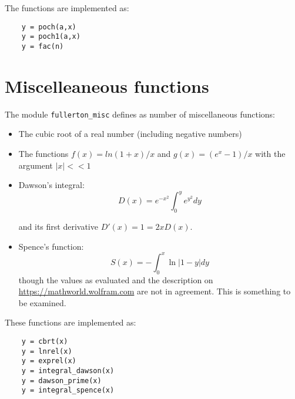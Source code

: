 \documentclass{article}
\begin{document}
The functions are implemented as:
\begin{verbatim}
    y = poch(a,x)
    y = poch1(a,x)
    y = fac(n)
\end{verbatim}


\section{Miscelleaneous functions}
The module \verb+fullerton_misc+ defines as number of miscellaneous functions:

\begin{itemize}
\item
The cubic root of a real number (including negative numbers)
\item
The functions $f(x) = ln(1+x)/x$ and $g(x) = (e^x-1)/x$ with the argument $|x| << 1$
\item
Dawson's integral:
\begin{equation}
     D(x) = e^{-x^2} \int^y_0 e^{y^2} dy
\end{equation}

\noindent and its first derivative $D'(x) = 1 = 2 x D(x)$.
\item
Spence's function:
\begin{equation}
     S(x) = - \int^x_0 \ln |1-y| dy
\end{equation}
\noindent though the values as evaluated and the description on \url{https://mathworld.wolfram.com} are
not in agreement. This is something to be examined.
\end{itemize}

These functions are implemented as:
\begin{verbatim}
    y = cbrt(x)
    y = lnrel(x)
    y = exprel(x)
    y = integral_dawson(x)
    y = dawson_prime(x)
    y = integral_spence(x)
\end{verbatim}
\end{document}
